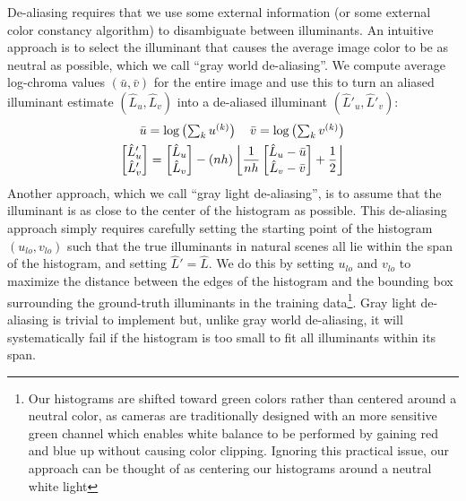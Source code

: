 \documentclass[10pt,twocolumn,letterpaper]{article}
\newcommand{\floor}[1]{\left \lfloor #1 \right \rfloor}
\newcommand{\binwidth}{h}
\begin{document}
De-aliasing requires that we use some external information (or some external
color constancy algorithm) to disambiguate between illuminants.
An intuitive approach is to select the illuminant
that causes the average image color to be as neutral as possible,
which we call ``gray world de-aliasing''.
We compute average log-chroma values $(\bar{u}, \bar{v})$ for the entire image
and use this to turn an aliased illuminant estimate $(\hat{L}_u, \hat{L}_v)$
into a de-aliased illuminant $(\hat{L}'_u, \hat{L}'_v)$:
\begin{align}
\bar{u} = \log \left( \textstyle \sum_k u^{(k)} \right) \quad
\bar{v} = \log \left( \textstyle \sum_k v^{(k)} \right) \\
\begin{bmatrix} \hat{L}'_u \\ \hat{L}'_v \end{bmatrix} = \begin{bmatrix} \hat{L}_u \\ \hat{L}_v \end{bmatrix} - (n \binwidth) \floor{{1 \over n \binwidth} \begin{bmatrix} \hat{L}_u - \bar{u} \\ \hat{L}_v - \bar{v} \end{bmatrix} + {1 \over 2} } %
\label{eq:grayworld}
\end{align}
Another approach, which we call ``gray light de-aliasing'', is to assume
that the illuminant is as close to the center of the histogram as possible.
This de-aliasing approach simply requires carefully setting the starting point
of the histogram $(u_{\mathit{lo}}, v_{\mathit{lo}})$ such that the true
illuminants in natural scenes all lie within the span of the histogram, and
setting $\hat{L}' = \hat{L}$.
We do this by setting $u_{\mathit{lo}}$ and $v_{\mathit{lo}}$
to maximize the distance between the edges
of the histogram and the bounding box surrounding the ground-truth illuminants
in the training data\footnote{Our histograms are shifted toward green colors
rather than centered around a neutral color, as cameras are traditionally
designed with an more sensitive green channel which enables white balance to be
performed by gaining red and blue up without causing color clipping. Ignoring
this practical issue, our approach can be thought of as centering our histograms
around a neutral white light}.
Gray light de-aliasing is trivial to implement but,
 unlike gray world de-aliasing, it will systematically
fail if the histogram is too small to fit all illuminants within its span.
\end{document}
